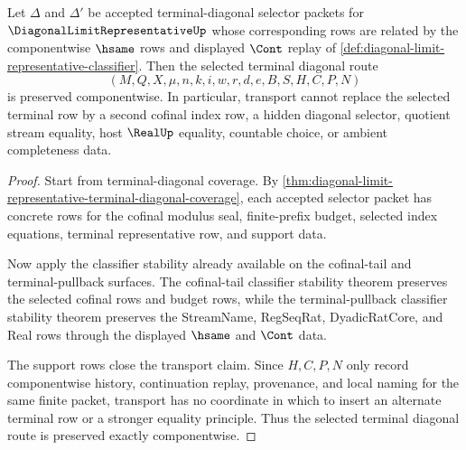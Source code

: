 \begin{theorem}
\label{thm:diagonal-limit-representative-terminal-diagonal-transport}
Let $\Delta$ and $\Delta'$ be accepted terminal-diagonal selector packets for $\DiagonalLimitRepresentativeUp$ whose corresponding rows are related by the componentwise $\hsame$ rows and displayed $\Cont$ replay of \autoref{def:diagonal-limit-representative-classifier}. Then the selected terminal diagonal route
$$
(M,Q,X,\mu,n,k,i,w,r,d,e,B,S,H,C,P,N)
$$
is preserved componentwise. In particular, transport cannot replace the selected terminal row by a second cofinal index row, a hidden diagonal selector, quotient stream equality, host $\RealUp$ equality, countable choice, or ambient completeness data.
\end{theorem}
\begin{proof}
Start from terminal-diagonal coverage. By \autoref{thm:diagonal-limit-representative-terminal-diagonal-coverage}, each accepted selector packet has concrete rows for the cofinal modulus seal, finite-prefix budget, selected index equations, terminal representative row, and support data.

Now apply the classifier stability already available on the cofinal-tail and terminal-pullback surfaces. The cofinal-tail classifier stability theorem preserves the selected cofinal rows and budget rows, while the terminal-pullback classifier stability theorem preserves the StreamName, RegSeqRat, DyadicRatCore, and Real rows through the displayed $\hsame$ and $\Cont$ data.

The support rows close the transport claim. Since $H,C,P,N$ only record componentwise history, continuation replay, provenance, and local naming for the same finite packet, transport has no coordinate in which to insert an alternate terminal row or a stronger equality principle. Thus the selected terminal diagonal route is preserved exactly componentwise.
\end{proof}

